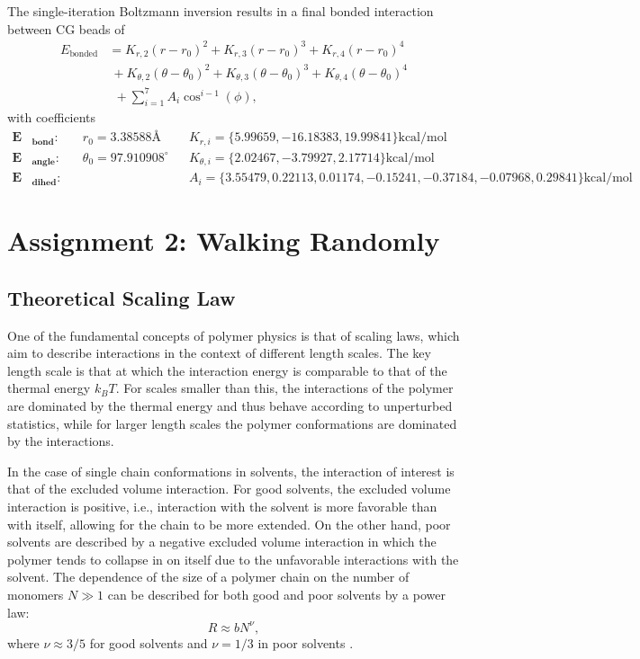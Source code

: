 \documentclass[10pt,a4paper]{labreport}
\begin{document}
  The single-iteration Boltzmann inversion results in a final bonded interaction between CG beads of
  \begin{equation}
    \begin{split}
      E_\text{bonded} &= K_{r,2}(r - r_0)^2 +   K_{r,3}(r - r_0)^3 +  K_{r,4}(r - r_0)^4 \\
                      &~+ K_{\theta,2}(\theta - \theta_0)^2 +   K_{\theta,3}(\theta - \theta_0)^3 +  K_{\theta,4}(\theta - \theta_0)^4  \\
                      &~~+ \sum_{i=1}^7 A_i \cos^{i-1}(\phi),
    \end{split}
    \label{eq:ass1_final_bondendEng}
  \end{equation}
  with coefficients
  \begin{align*}
    \bm{E}&_\textbf{bond}: && r_0 =  3.38588 \text{\AA} && K_{r,i} = \{5.99659, -16.18383, 19.99841\}\text{kcal/mol} \\
    \bm{E}&_\textbf{angle}: && \theta_0 =  97.910908 ^\circ&& K_{\theta,i} = \{2.02467, -3.79927, 2.17714\}\text{kcal/mol} \\
    \bm{E}&_\textbf{dihed}: && && A_i = \{3.55479, 0.22113, 0.01174, -0.15241, -0.37184, -0.07968, 0.29841\}\text{kcal/mol}
  \end{align*}



\newpage
\section{Assignment 2: Walking Randomly}
\subsection{Theoretical Scaling Law}
One of the fundamental concepts of polymer physics is that of scaling laws, which aim to describe interactions in the context of different length scales.
The key length scale is that at which the interaction energy is comparable to that of the thermal energy $k_BT$. 
For scales smaller than this, the interactions of the polymer are dominated by the thermal energy and thus behave according to unperturbed statistics, while for larger length scales the polymer conformations are dominated by the interactions.

In the case of single chain conformations in solvents, the interaction of interest is that of the excluded volume interaction. For good solvents, the excluded volume interaction is positive, i.e., interaction with the solvent is more favorable than with itself, allowing for the chain to be more extended. On the other hand, poor solvents are described by a negative excluded volume interaction in which the polymer tends to collapse in on itself due to the unfavorable interactions with the solvent. The dependence of the size of a polymer chain on the number of monomers $N \gg 1$ can be described for both good and poor solvents by a power law:
\begin{equation}
  R \approx b N^\nu,
\end{equation}
where $\nu \approx 3/5$ for good solvents and $\nu = 1/3$ in poor solvents \cite{}. 
\end{document}
